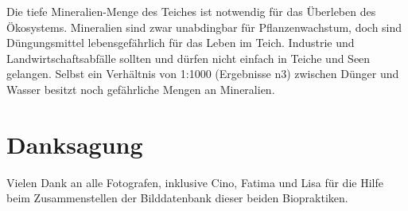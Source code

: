\documentclass{article}
\begin{document}
        \vspace{5mm}
        Die tiefe Mineralien-Menge des Teiches ist notwendig für das Überleben des Ökosystems. Mineralien sind zwar unabdingbar für Pflanzenwachstum, doch sind Düngungsmittel lebensgefährlich für das Leben im Teich. Industrie und Landwirtschaftsabfälle sollten und dürfen nicht einfach in Teiche und Seen gelangen. \cite{Tagi} Selbst ein Verhältnis von 1:1000 (Ergebnisse n3) zwischen Dünger und Wasser besitzt noch gefährliche Mengen an Mineralien. \\
       
    \section{Danksagung}

    Vielen Dank an alle Fotografen, inklusive Cino, Fatima und Lisa für die Hilfe beim Zusammenstellen der Bilddatenbank dieser beiden Biopraktiken.
\end{document}
